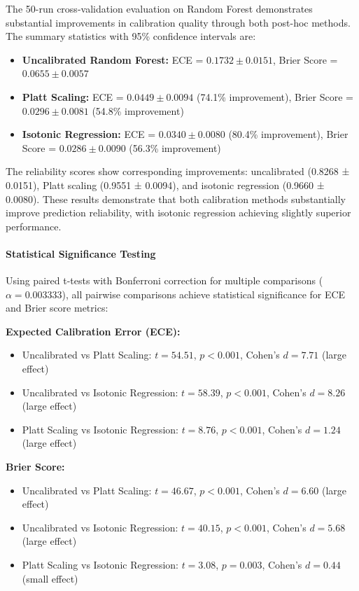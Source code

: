 \documentclass[12pt, a4paper]{article}
\begin{document}
The 50-run cross-validation evaluation on Random Forest demonstrates substantial improvements in calibration quality through both post-hoc methods. The summary statistics with 95\% confidence intervals are:

\begin{itemize}
    \item \textbf{Uncalibrated Random Forest:} ECE = $0.1732 \pm 0.0151$, Brier Score = $0.0655 \pm 0.0057$
    \item \textbf{Platt Scaling:} ECE = $0.0449 \pm 0.0094$ (74.1\% improvement), Brier Score = $0.0296 \pm 0.0081$ (54.8\% improvement)
    \item \textbf{Isotonic Regression:} ECE = $0.0340 \pm 0.0080$ (80.4\% improvement), Brier Score = $0.0286 \pm 0.0090$ (56.3\% improvement)
\end{itemize}

The reliability scores show corresponding improvements: uncalibrated (0.8268 ± 0.0151), Platt scaling (0.9551 ± 0.0094), and isotonic regression (0.9660 ± 0.0080). These results demonstrate that both calibration methods substantially improve prediction reliability, with isotonic regression achieving slightly superior performance.

\paragraph{Statistical Significance Testing}

Using paired t-tests with Bonferroni correction for multiple comparisons ($\alpha = 0.003333$), all pairwise comparisons achieve statistical significance for ECE and Brier score metrics:

\textbf{Expected Calibration Error (ECE):}
\begin{itemize}
    \item Uncalibrated vs Platt Scaling: $t = 54.51$, $p < 0.001$, Cohen's $d = 7.71$ (large effect)
    \item Uncalibrated vs Isotonic Regression: $t = 58.39$, $p < 0.001$, Cohen's $d = 8.26$ (large effect)
    \item Platt Scaling vs Isotonic Regression: $t = 8.76$, $p < 0.001$, Cohen's $d = 1.24$ (large effect)
\end{itemize}

\textbf{Brier Score:}
\begin{itemize}
    \item Uncalibrated vs Platt Scaling: $t = 46.67$, $p < 0.001$, Cohen's $d = 6.60$ (large effect)
    \item Uncalibrated vs Isotonic Regression: $t = 40.15$, $p < 0.001$, Cohen's $d = 5.68$ (large effect)
    \item Platt Scaling vs Isotonic Regression: $t = 3.08$, $p = 0.003$, Cohen's $d = 0.44$ (small effect)
\end{itemize}
\end{document}

